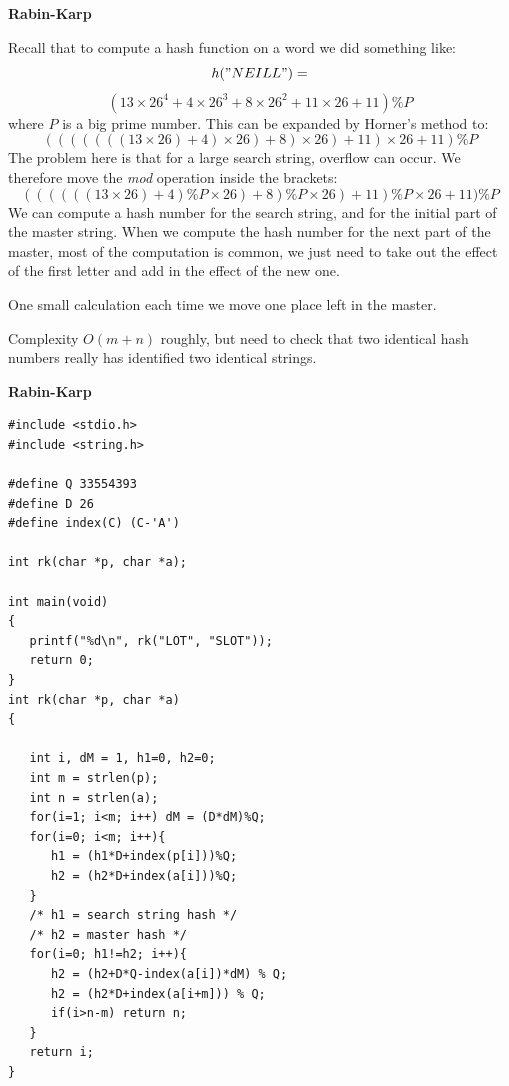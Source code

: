 \documentclass[a4,portraitt]{slides}
\begin{document}
\newpage
{\samepage
\begin{center}
{\Large{\bf Rabin-Karp}}
\end{center}
{\small
Recall that to compute a hash function on a word we did something like:
\[
h("NEILL") =
\]
{\small
\[
(13\times26^4 + 4\times26^3 + 8\times26^2 + 11\times26 + 11) \% P
\]
}
where $P$ is a big prime number.
This can be expanded by Horner's method to:
{\small
\[
(((((((13\times26)+ 4)\times26) + 8)\times26) + 11)\times26 + 11) \% P
\]
}
The problem here is that for a large search string, overflow can occur.
We therefore move the {\it mod} operation inside the brackets:
{\small
\[
((((((13\times26)+ 4)\%P \times26) + 8)\%P \times26) + 11)\%P \times26 + 11) \% P
\]
}
We can compute a hash number for the search string, and for the initial
part of the master string.
When we compute the hash number for the next part of the master, most
of the computation is common, we just need to take out the effect of the first letter and add in the effect of the new one.

One small calculation each time we move one place left in the master.

Complexity $O(m+n)$ roughly, but need to check that two identical hash
numbers really has identified two identical strings.
}}

\newpage
{\samepage
\begin{center}
{\Large{\bf Rabin-Karp}}
\end{center}
{\small
\begin{verbatim}
#include <stdio.h>
#include <string.h>

#define Q 33554393
#define D 26
#define index(C) (C-'A')

int rk(char *p, char *a);

int main(void)
{
   printf("%d\n", rk("LOT", "SLOT"));
   return 0;
}
int rk(char *p, char *a)
{

   int i, dM = 1, h1=0, h2=0;
   int m = strlen(p);
   int n = strlen(a);
   for(i=1; i<m; i++) dM = (D*dM)%Q;
   for(i=0; i<m; i++){
      h1 = (h1*D+index(p[i]))%Q;
      h2 = (h2*D+index(a[i]))%Q;
   }
   /* h1 = search string hash */
   /* h2 = master hash */
   for(i=0; h1!=h2; i++){
      h2 = (h2+D*Q-index(a[i])*dM) % Q;
      h2 = (h2*D+index(a[i+m])) % Q;
      if(i>n-m) return n;
   }
   return i;
}
\end{verbatim}
}}
\end{document}

